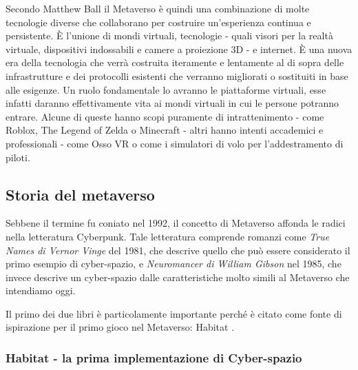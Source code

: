     Secondo Matthew Ball il Metaverso è quindi una combinazione di molte tecnologie diverse che collaborano per costruire un'esperienza continua e persistente.
    È l'unione di mondi virtuali, tecnologie - quali visori per la realtà virtuale, dispositivi indossabili e camere a proiezione 3D - e internet.
    È una nuova era della tecnologia che verrà costruita iteramente e lentamente al di sopra delle infrastrutture e dei protocolli esistenti che verranno migliorati o sostituiti in base alle esigenze.
    Un ruolo fondamentale lo avranno le piattaforme virtuali, esse infatti daranno effettivamente vita ai mondi virtuali in cui le persone potranno entrare.
    Alcune di queste hanno scopi puramente di intrattenimento - come Roblox, The Legend of Zelda o Minecraft - altri hanno intenti accademici e professionali - come Osso VR o come i simulatori di volo per l'addestramento di piloti.


    \subsection{Storia del metaverso}
    Sebbene il termine fu coniato nel 1992, il concetto di Metaverso affonda le radici nella letteratura Cyberpunk.
    Tale letteratura comprende romanzi come \textit{True Names di Vernor Vinge} del 1981, che descrive quello che può essere considerato il primo esempio di cyber-spazio, e \textit{Neuromancer di William Gibson} nel 1985, che invece descrive un cyber-spazio dalle caratteristiche molto simili al Metaverso che intendiamo oggi.

    Il primo dei due libri è particolamente importante perché è citato come fonte di ispirazione per il primo gioco nel Metaverso: Habitat \cite{Habitat1990}.

        \subsubsection{Habitat - la prima implementazione di Cyber-spazio}

